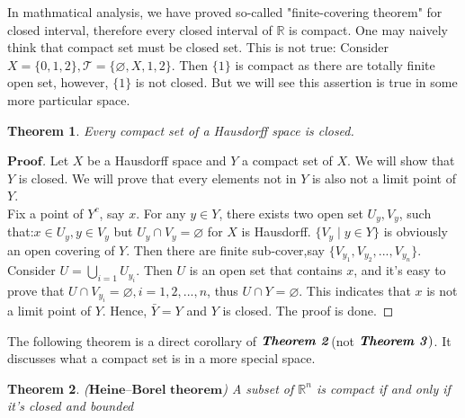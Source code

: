 \documentclass[a4paper, 11pt]{article}
\newtheorem{theorem}{Theorem}
\theoremstyle{definition}
\theoremstyle{remark}
\newenvironment{myprf}
{\renewcommand\qedsymbol{$ $}\begin{proof}[$\mathbf{Proof}$]}
  {\end{proof}}
\theoremstyle{definition}
\begin{document}
In mathmatical analysis, we have proved so-called "finite-covering theorem" for
closed interval, therefore every closed interval of $\mathbb{R}$ is 
compact. One may naively think that compact set must be closed set. This
is not true: Consider $X=\{0, 1, 2\}, \mathcal{T}=\{\varnothing, X, {1,2}\}$. 
Then $\{1\}$ is compact as there are totally finite open set, however, 
$\{1\}$ is not closed. But we will see this assertion is true in some more 
particular space.
\vspace{0.4cm}

\begin{theorem}
        Every compact set of a Hausdorff space is closed.
\end{theorem}
\begin{myprf}
        Let $X$ be a Hausdorff space and $Y$ a compact set of $X$. We will show
        that $Y$ is closed. We will prove that every elements not in $Y$ is
        also not a limit point of $Y$.\\
        \indent Fix a point of $Y^{c}$, say $x$. For any $y\in Y$, there exists
        two open set $U_y, V_y$, such that:$x\in U_y, y\in V_y$ but 
        $U_y\cap V_y=\varnothing$ for $X$ is Hausdorff. $\{V_y\mid y\in Y\}$
        is obviously an open covering of $Y$. Then there are finite sub-cover,say
        $\{V_{y_1}, V_{y_2},...,V_{y_n}\}$. Consider $\displaystyle U=
        \bigcup_{i=1}U_{y_i}$. Then $U$ is an open set that contains $x$, and it's 
        easy to prove that $U\cap V_{y_i}=\varnothing, i=1,2,...,n$, thus 
        $U\cap Y=\varnothing$. This indicates that $x$ is not a limit point of 
        $Y$. Hence, $\bar{Y}=Y$ and $Y$ is closed. The proof is done.
\end{myprf}
The following theorem is a direct corollary of $\textbf{\textit{Theorem 2}}$(not
$\textbf{\textit{Theorem 3}})$. It discusses what a compact set is in a more 
special space.
\begin{theorem}($\textbf{Heine–Borel theorem}$)
        A subset of $\mathbb{R}^n$ is compact if and only if it's closed and 
        bounded
\end{theorem}
\end{document}
